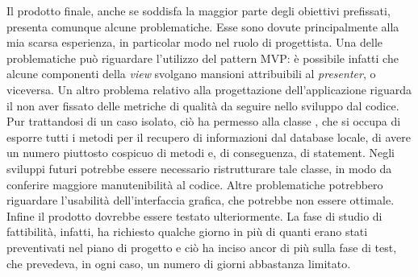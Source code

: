 \documentclass[../Tesi.tex]{subfiles}
\begin{document}
	Il prodotto finale, anche se soddisfa la maggior parte degli obiettivi prefissati, presenta comunque alcune problematiche. Esse sono dovute principalmente alla mia scarsa esperienza, in particolar modo nel ruolo di progettista. Una delle problematiche può riguardare l'utilizzo del pattern MVP: è possibile infatti che alcune componenti della \textit{view} svolgano mansioni attribuibili al \textit{presenter}, o viceversa. Un altro problema relativo alla progettazione dell'applicazione riguarda il non aver fissato delle metriche di qualità da seguire nello sviluppo dal codice. Pur trattandosi di un caso isolato, ciò ha permesso alla classe , che si occupa di esporre tutti i metodi per il recupero di informazioni dal database locale, di avere un numero piuttosto cospicuo di metodi e, di conseguenza, di statement. Negli sviluppi futuri potrebbe essere necessario ristrutturare tale classe, in modo da conferire maggiore manutenibilità al codice. Altre problematiche potrebbero riguardare l'usabilità dell'interfaccia grafica, che potrebbe non essere ottimale. Infine il prodotto dovrebbe essere testato ulteriormente. La fase di studio di fattibilità, infatti, ha richiesto qualche giorno in più di quanti erano stati preventivati nel piano di progetto e ciò ha inciso ancor di più sulla fase di test, che prevedeva, in ogni caso, un numero di giorni abbastanza limitato.
\end{document}
